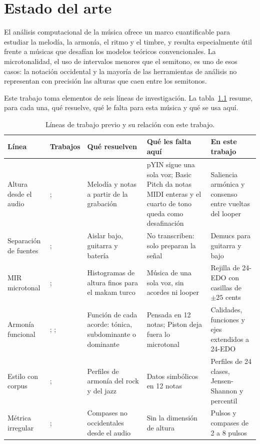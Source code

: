\chapter{Estado del arte}\label{cap:estado}

El análisis computacional de la música ofrece un marco cuantificable para estudiar la melodía, la armonía, el ritmo y el
timbre, y resulta especialmente útil frente a músicas que desafían los modelos teóricos convencionales. La
microtonalidad, el uso de intervalos menores que el semitono, es uno de esos casos: la notación occidental y la mayoría
de las herramientas de análisis no representan con precisión las alturas que caen entre los semitonos.

Este trabajo toma elementos de seis líneas de investigación. La tabla~\ref{tab:estado} resume, para cada una, qué
resuelve, qué le falta para esta música y qué se usa aquí.

\begin{table}[ht]
  \centering\small
  \caption{Líneas de trabajo previo y su relación con este trabajo.}\label{tab:estado}
  \begin{tabularx}{\textwidth}{@{}>{\raggedright}p{2.2cm}>{\raggedright}p{3.1cm}>{\raggedright}X>{\raggedright}X>{\raggedright\arraybackslash}X@{}}
    \toprule
    Línea & Trabajos & Qué resuelven & Qué les falta aquí & En este trabajo \\
    \midrule
    Altura desde el audio & \citet{mauch2014}; \citet{bittner2022} & Melodía y notas a partir de la grabación &
      pYIN sigue una sola voz; Basic Pitch da notas MIDI enteras y el cuarto de tono queda como desafinación &
      Saliencia armónica y consenso entre vueltas del looper \\
    Separación de fuentes & \citet{rouard2023}; \citet{lu2024} & Aislar bajo, guitarra y batería &
      No transcriben: solo preparan la señal & Demucs para guitarra y bajo \\
    MIR microtonal & \citet{bozkurt2008}; \citet{gedik2010} & Histogramas de altura finos para el makam turco &
      Música de una sola voz, sin acordes ni looper & Rejilla de 24-EDO con casillas de $\pm25$ cents \\
    Armonía funcional & \citet{riemann1893}; \citet{lendvai1971}; \citet{piston1987} &
      Función de cada acorde: tónica, subdominante o dominante & Pensada en 12 notas; Piston deja fuera lo microtonal &
      Calidades, funciones y ejes extendidos a 24-EDO \\
    Estilo con corpus & \citet{declercq2011}; \citet{broze2013} & Perfiles de armonía del rock y del jazz &
      Datos simbólicos en 12 notas & Perfiles de 24 clases, Jensen-Shannon y percentil \\
    Métrica irregular & \citet{holzapfel2014}; \citet{srinivasamurthy2016} & Compases no occidentales desde el audio &
      Sin la dimensión de altura & Pulsos y compases de 2 a 8 pulsos \\
    \bottomrule
  \end{tabularx}
\end{table}

